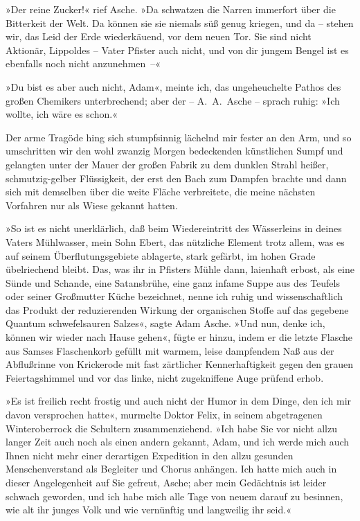 »Der reine Zucker!« rief Asche. »Da schwatzen die Narren immerfort
über die Bitterkeit der Welt. Da können sie sie niemals süß genug
kriegen, und da – stehen wir, das Leid der Erde wiederkäuend, vor
dem neuen Tor. Sie sind nicht Aktionär, Lippoldes – Vater Pfister
auch nicht, und von dir jungem Bengel ist es ebenfalls noch nicht
anzunehmen~–«

»Du bist es aber auch nicht, Adam«, meinte ich, das ungeheuchelte
Pathos des großen Chemikers unterbrechend; aber der – A.~A.~Asche –
sprach ruhig: »Ich wollte, ich wäre es schon.«

Der arme Tragöde hing sich stumpfsinnig lächelnd mir fester an den
Arm, und so umschritten wir den wohl zwanzig Morgen bedeckenden
künstlichen Sumpf und gelangten unter der Mauer der großen Fabrik
zu dem dunklen Strahl heißer, schmutzig-gelber Flüssigkeit, der
erst den Bach zum Dampfen brachte und dann sich mit demselben über
die weite Fläche verbreitete, die meine nächsten Vorfahren nur als
Wiese gekannt hatten.

»So ist es nicht unerklärlich, daß beim Wiedereintritt des
Wässerleins in deines Vaters Mühlwasser, mein Sohn Ebert, das
nützliche Element trotz allem, was es auf seinem
Überflutungsgebiete ablagerte, stark gefärbt, im hohen Grade
übelriechend bleibt. Das, was ihr in Pfisters Mühle dann, laienhaft
erbost, als eine Sünde und Schande, eine Satansbrühe, eine ganz
infame Suppe aus des Teufels oder seiner Großmutter Küche
bezeichnet, nenne ich ruhig und wissenschaftlich das Produkt der
reduzierenden Wirkung der organischen Stoffe auf das gegebene
Quantum schwefelsauren Salzes«, sagte Adam Asche. »Und nun, denke
ich, können wir wieder nach Hause gehen«, fügte er hinzu, indem er
die letzte Flasche aus Samses Flaschenkorb gefüllt mit warmem,
leise dampfendem Naß aus der Abflußrinne von Krickerode mit fast
zärtlicher Kennerhaftigkeit gegen den grauen Feiertagshimmel und
vor das linke, nicht zugekniffene Auge prüfend erhob.

»Es ist freilich recht frostig und auch nicht der Humor in dem
Dinge, den ich mir davon versprochen hatte«, murmelte Doktor Felix,
in seinem abgetragenen Winteroberrock die Schultern
zusammenziehend. »Ich habe Sie vor nicht allzu langer Zeit auch
noch als einen andern gekannt, Adam, und ich werde mich auch Ihnen
nicht mehr einer derartigen Expedition in den allzu gesunden
Menschenverstand als Begleiter und Chorus anhängen. Ich hatte mich
auch in dieser Angelegenheit auf Sie gefreut, Asche; aber mein
Gedächtnis ist leider schwach geworden, und ich habe mich alle Tage
von neuem darauf zu besinnen, wie alt ihr junges Volk und wie
vernünftig und langweilig ihr seid.«

